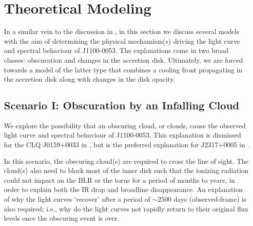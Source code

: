 \documentclass[a4paper,fleqn,usenatbib]{mnras}
\begin{document}
\section{Theoretical Modeling} 
In a similar vein to the discussion in \cite{Stern2018}, in this
section we discuss several models with the aim of determining the
physical mechamism(s) driving the light curve and spectral behaviour
of J1100-0053. The explanations come in two broad classes: obscuration
and changes in the accretion disk. Ultimately, we are forced towards
a model of the latter type that combines a cooling front propagating
in the accretion disk along with changes in the disk opacity.

\subsection{Scenario I: Obscuration by an Infalling Cloud}
We explore the possibility that an obscuring cloud, or clouds, cause
the observed light curve and spectral behaviour of J1100-0053. This
explanation is dismissed for the CLQ J0159+0033
in \citet{LaMassa2015}, but is the preferred explanation for
J2317+0005 in \citet{Guo2016}.

In this scenario, the obscuring cloud(s) are required to cross the line
of sight. The cloud(s) also need to block most of the inner disk such
that the ionizing radiation could not impact on the BLR or the torus
for a period of months to years, in order to explain both the IR drop and
broadline disappearance. An explanation of why the light curves
`recover' after a period of $\sim 2500$ days (observed-frame) is also
required; i.e., why do the light curves not rapidly return to their
original flux levels once the obscuring event is over.
\end{document}
